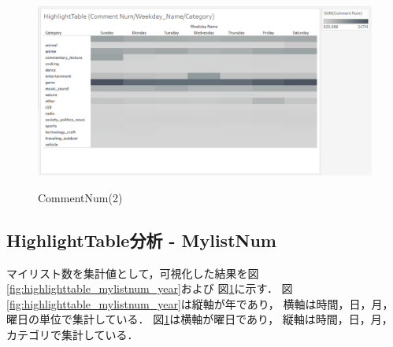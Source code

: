 \documentclass[submit,techrep,noauthor]{ipsj}
\begin{document}
\begin{figure}[h]
\begin{minipage}[b]{0.49\columnwidth}
    \label{fig:highlighttable_comment_num_weekdaynameMonth}
  \end{minipage}
  \begin{minipage}[b]{0.49\columnwidth}
    \centering
    \includegraphics[width=\columnwidth]{./eps/HighlightTable_CommentNum_WeekdayNameCategory.eps}
    \label{fig:highlighttable_comment_num_weekdaynamecategory}
  \end{minipage}
  \vspace{-1.0zh}
  \caption{CommentNum(2)}
  \label{fig:highlighttable_comment_num_week}
  \vspace{-1.0zh}
\end{figure}


\newpage
\subsection{HighlightTable分析 - MylistNum}

マイリスト数を集計値として，可視化した結果を図\ref{fig:highlighttable_mylistnum_year}および
図\ref{fig:highlighttable_comment_num_week}に示す．
%
図\ref{fig:highlighttable_mylistnum_year}は縦軸が年であり，
横軸は時間，日，月，曜日の単位で集計している．
図\ref{fig:highlighttable_comment_num_week}は横軸が曜日であり，
縦軸は時間，日，月，カテゴリで集計している．
\end{document}
